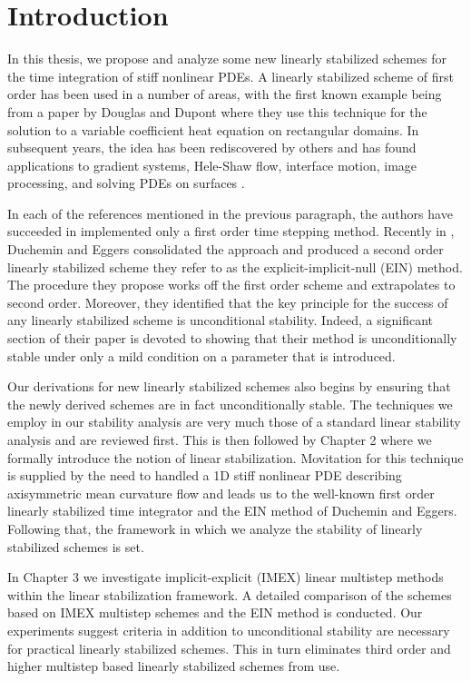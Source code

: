 \chapter{Introduction}
In this thesis, we propose and analyze some new linearly stabilized schemes for the time integration of stiff nonlinear PDEs. A linearly stabilized scheme of first order has been used in a number of areas, with the first known example being from a paper by Douglas and Dupont \cite{douglas1971alternating} where they use this technique for the solution to a variable coefficient heat equation on rectangular domains. In subsequent years, the idea has been rediscovered by others \cite{eyre1998unconditionally,smereka2003semi} and has found applications to gradient systems, Hele-Shaw flow, interface motion, image processing, and solving PDEs on surfaces \cite{eyre1998bunconditionally,salac2008local,glasner2002diffuse,schonlieb2011unconditionally,macdonald2009implicit}.

In each of the references mentioned in the previous paragraph, the authors have succeeded in implemented only a first order time stepping method. Recently in \cite{duchemin2014explicit},  Duchemin and Eggers consolidated the approach and produced a second order linearly stabilized scheme they refer to as the explicit-implicit-null (EIN) method. The procedure they propose works off the first order scheme and extrapolates to second order. Moreover, they identified that the key principle for the success of any linearly stabilized scheme is unconditional stability. Indeed, a significant section of their paper is devoted to showing that their method is unconditionally stable under only a mild condition on a parameter that is introduced.

Our derivations for new linearly stabilized schemes also begins by ensuring that the newly derived schemes are in fact unconditionally stable. The techniques we employ in our stability analysis are very much those of a standard linear stability analysis and are reviewed first. This is then followed by Chapter 2 where we formally introduce the notion of linear stabilization. Movitation for this technique is supplied by the need to handled a 1D stiff nonlinear PDE describing axisymmetric mean curvature flow and leads us to the well-known first order linearly stabilized time integrator and the EIN method of Duchemin and Eggers. Following that, the framework in which we analyze the stability of linearly stabilized schemes is set. 

In Chapter 3 we investigate implicit-explicit (IMEX) linear multistep methods within the linear stabilization framework. A detailed comparison of the schemes based on IMEX multistep schemes and the EIN method is conducted. Our experiments suggest criteria in addition to unconditional stability are necessary for practical linearly stabilized schemes. This in turn eliminates third order and higher multistep based linearly stabilized schemes from use. 

